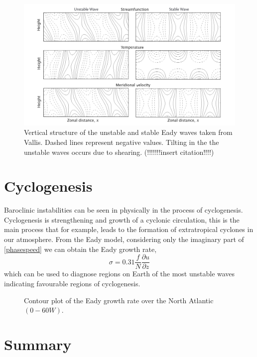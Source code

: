 \documentclass[a4paper,12pt]{article}
\begin{document}
\begin{figure}[htp!]
  \centering
  \includegraphics[width=\textwidth]{growthrates.png}
  \caption{Vertical structure of the unstable and stable Eady waves taken from Vallis. Dashed lines represent negative values. Tilting in the the unstable waves occurs due to shearing. (!!!!!!!insert citation!!!!)} 
  \label{growthpicture}
\end{figure}

\section{Cyclogenesis} 
Baroclinic instabilities can be seen in physically in the process of cyclogenesis. Cyclogenesis is strengthening and growth of a cyclonic circulation, this is the main process that for example, leads to the formation of extratropical cyclones in our atmosphere. From the Eady model, considering only the imaginary part of \ref{phasespeed} we can obtain the Eady growth rate, 
\begin{equation}
  \sigma = 0.31\frac{f}{N}\frac{\partial u}{\partial z}
\end{equation}
which can be used to diagnose regions on Earth of the most unstable waves indicating favourable regions of cyclogenesis.
\begin{figure}[!htp]
  \centering
  \caption{Contour plot of the Eady growth rate over the North Atlantic $(0-60W)$.}
\end{figure} 
\section{Summary}
%
%
\printbibliography
\end{document}
